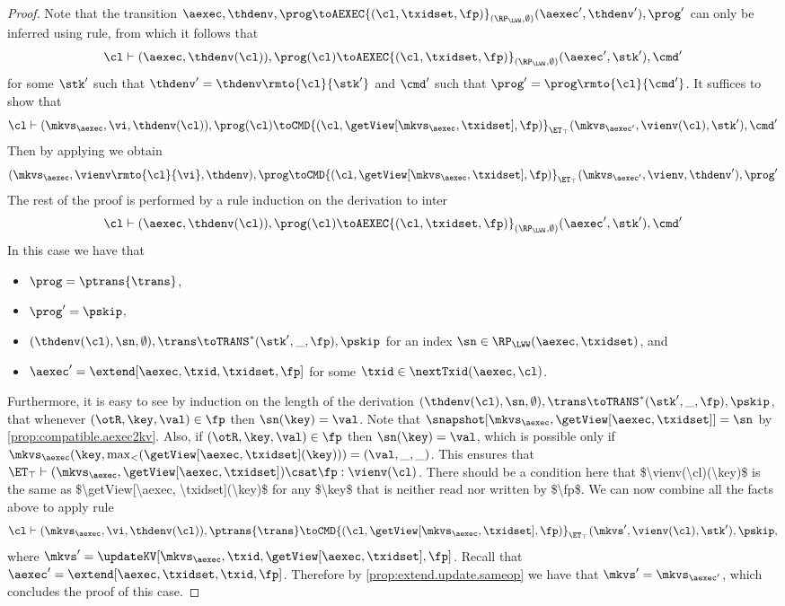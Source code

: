 \begin{proof}
Note that the transition 
$\aexec, \thdenv, \prog \toAEXEC{(\cl, \txidset, \fp)}_{(\RP_{\LWW}, \emptyset)} (\aexec', \thdenv'), \prog'$ 
can only be inferred using  rule, 
from which it follows that 
\[
    \cl \vdash (\aexec, \thdenv(\cl)), \prog(\cl) 
    \toAEXEC{(\cl, \txidset, \fp)}_{(\RP_{\LWW}, \emptyset)} (\aexec' ,\stk'), \cmd'
\]
for some $\stk'$ such that $\thdenv' = \thdenv\rmto{\cl}{\stk'}$ 
and $\cmd'$ such that $\prog' = \prog\rmto{\cl}{\cmd'}$.
It suffices to show that 
\[
    \cl \vdash (\mkvs_\aexec, \vi, \thdenv(\cl)), \prog(\cl) 
   \toCMD{(\cl, \getView[\mkvs_{\aexec}, \txidset], \fp)}_{\ET_{\top}} 
    (\mkvs_{\aexec'}, \vienv(\cl), \stk'), \cmd'
\]
Then by applying  we obtain 
\[
    (\mkvs_{\aexec}, \vienv\rmto{\cl}{\vi}, \thdenv), \prog 
    \toCMD{(\cl, \getView[\mkvs_{\aexec}, \txidset], \fp)}_{\ET_{\top}} 
    (\mkvs_{\aexec'}, \vienv, \thdenv'), \prog'
\]
The rest of the proof is performed by a rule induction on the derivation to inter 
\[ 
    \cl \vdash (\aexec, \thdenv(\cl)), \prog(\cl) 
    \toAEXEC{(\cl, \txidset, \fp)}_{(\RP_{\LWW}, \emptyset)} (\aexec', \stk'), \cmd'
\]
In this case we have that 
\begin{itemize}
    \item $\prog = \ptrans{\trans}$, 
    \item $\prog' = \pskip$, 
    \item $(\thdenv(\cl), \sn, \emptyset), \trans \toTRANS^{\ast} (\stk', \_, \fp), \pskip$ for an index $\sn \in \RP_{\LWW}(\aexec, \txidset)$, and 
    \item $\aexec' = \extend[\aexec, \txid, \txidset, \fp]$ for some $\txid \in \nextTxid(\aexec, \cl)$. 
\end{itemize}
Furthermore, it is easy to see by induction on the length of the derivation 
$(\thdenv(\cl), \sn, \emptyset), \trans \toTRANS^{\ast} (\stk', \_, \fp), \pskip$, 
that whenever $(\otR, \key, \val) \in \fp$ then $\sn(\key) = \val$.
Note that $\snapshot[\mkvs_{\aexec}, \getView[\aexec, \txidset]] = \sn$ by \cref{prop:compatible.aexec2kv}.
Also, if $(\otR,\key, \val) \in \fp$ then $\sn(\key) = \val$, which is possible only if  
$\mkvs_{\aexec}(\key, \max_{<}(\getView[\aexec, \txidset](\key))) = (\val, \_, \_)$.
This ensures that $\ET_{\top} \vdash (\mkvs_{\aexec}, \getView[\aexec, \txidset]) \csat \fp: \vienv(\cl)$. 
\ac{There should be a condition here that $\vienv(\cl)(\key)$ is the same as $\getView[\aexec, \txidset](\key)$ 
for any $\key$ that is neither read nor written by $\fp$.} 
We can now combine all the facts above to apply rule 
\[
    \cl \vdash (\mkvs_{\aexec}, \vi, \thdenv(\cl)), \ptrans{\trans}
    \toCMD{(\cl, \getView[\mkvs_{\aexec}, \txidset], \fp)}_{\ET_{\top}} 
    (\mkvs', \vienv(\cl), \stk'), \pskip, 
\] 
where $\mkvs' = \updateKV[\mkvs_{\aexec}, \txid, \getView[\aexec, \txidset], \fp]$. 
Recall that $\aexec' = \extend[\aexec, \txidset, \txid, \fp]$. 
Therefore by \cref{prop:extend.update.sameop} we have that $\mkvs' = \mkvs_{\aexec'}$, 
which concludes the proof of this case.


\end{proof}
